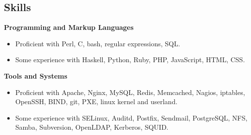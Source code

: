 \documentclass[line]{res}
\begin{document}
\begin{resume}
\section{Skills}

\textbf{Programming and Markup Languages}
\begin{itemize}
\item Proficient with Perl, C, bash, regular expressions, SQL.
\item Some experience with Haskell, Python, Ruby, PHP, JavaScript, HTML, CSS.
\end{itemize}

\textbf{Tools and Systems}
\begin{itemize}
\item Proficient with Apache, Nginx, MySQL, Redis, Memcached, Nagios, iptables, OpenSSH, BIND, git, PXE, linux kernel and userland.
\item Some experience with SELinux, Auditd, Postfix, Sendmail, PostgreSQL, NFS, Samba, Subversion, OpenLDAP, Kerberos, SQUID.
\end{itemize}

\end{resume}
\end{document}
